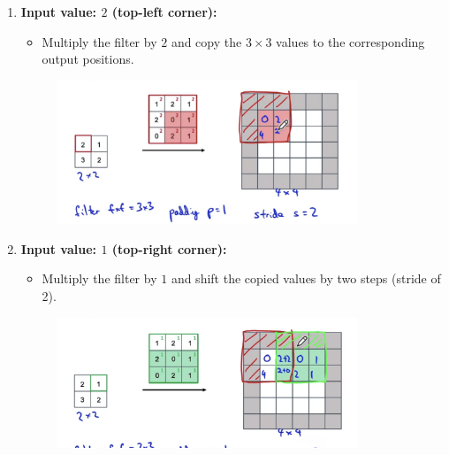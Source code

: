 \documentclass[letterpaper,12pt,notitlepage,twoside]{report}
\begin{document}
\begin{enumerate}
    \item \textbf{Input value: $2$ (top-left corner):}
    \begin{itemize}
        \item Multiply the filter by $2$ and copy the $3 \times 3$ values to the corresponding output positions.
    \end{itemize}
	\begin{figure}[h]
		\centering
		\includegraphics[width=0.85\textwidth]{Images/Transpose Convolution - Step 1.png}
		\label{fig:46}
	\end{figure}
	\FloatBarrier

    \item \textbf{Input value: $1$ (top-right corner):}
    \begin{itemize}
        \item Multiply the filter by $1$ and shift the copied values by two steps (stride of 2).
    \end{itemize}
	\begin{figure}[h]
		\centering
		\includegraphics[width=0.85\textwidth]{Images/Transpose Convolution - Step 2.png}
		\label{fig:47}
	\end{figure}
	\FloatBarrier


\end{enumerate}
\end{document}
